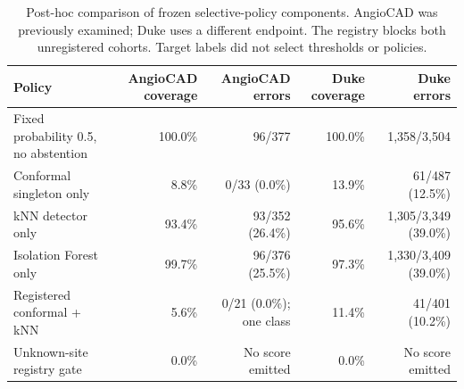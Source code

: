 \begin{table}[t]
\centering
\caption{Post-hoc comparison of frozen selective-policy components. AngioCAD was previously examined; Duke uses a different endpoint. The registry blocks both unregistered cohorts. Target labels did not select thresholds or policies.}
\label{tab:selective-policy-components}
\scriptsize
\begin{tabular}{lrrrr}
\toprule
Policy & AngioCAD coverage & AngioCAD errors & Duke coverage & Duke errors \\
\midrule
Fixed probability 0.5, no abstention & 100.0\% & 96/377 & 100.0\% & 1,358/3,504 \\
Conformal singleton only & 8.8\% & 0/33 (0.0\%) & 13.9\% & 61/487 (12.5\%) \\
kNN detector only & 93.4\% & 93/352 (26.4\%) & 95.6\% & 1,305/3,349 (39.0\%) \\
Isolation Forest only & 99.7\% & 96/376 (25.5\%) & 97.3\% & 1,330/3,409 (39.0\%) \\
Registered conformal + kNN & 5.6\% & 0/21 (0.0\%); one class & 11.4\% & 41/401 (10.2\%) \\
Unknown-site registry gate & 0.0\% & No score emitted & 0.0\% & No score emitted \\
\bottomrule
\end{tabular}
\end{table}
